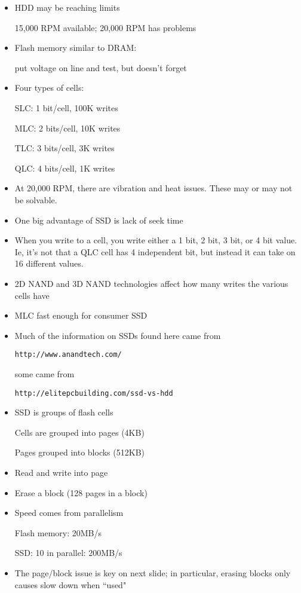 \begin{frame}[fragile]
\begin{itemize}
	\item HDD may be reaching limits

		15,000 RPM available; 20,000 RPM has problems
	\item Flash memory similar to DRAM:

		put voltage on line and test, but doesn't forget
	\item Four types of cells:

		SLC: 1 bit/cell, 100K writes

		MLC: 2 bits/cell, 10K writes

		TLC: 3 bits/cell, 3K writes

		QLC: 4 bits/cell, 1K writes

\end{itemize}
\BNotes\ifnum{}
\begin{itemize}
\item At 20,000 RPM, there are vibration and heat issues.  These may or
	may not be solvable.
\item One big advantage of SSD is lack of seek time
\item When you write to a cell, you write either a 1 bit, 2 bit, 3 bit, or 4 bit value.  Ie, it's not that a QLC cell has 4 independent bit, but instead it can take on 16 different values.
\item 2D NAND and 3D NAND technologies affect how many writes the various
		cells have

\item MLC fast enough for consumer SSD
\item Much of the information on SSDs found here came from

\texttt{http://www.anandtech.com/}

some came from

\texttt{http://elitepcbuilding.com/ssd-vs-hdd}
\end{itemize}
\fi\ENotes
\end{frame}

\begin{frame}[fragile]
\begin{itemize}
	\item SSD is groups of flash cells

	Cells are grouped into pages (4KB)

	Pages grouped into blocks (512KB)
	\item Read and write into page
	\item Erase a block (128 pages in a block)
	\item Speed comes from parallelism

		Flash memory: 20MB/s

		SSD: 10 in parallel: 200MB/s
\end{itemize}
\BNotes\ifnum{}
\begin{itemize}
\item The page/block issue is key on next slide; in particular, erasing
	blocks only causes slow down when ``used"
\end{itemize}
\fi\ENotes
\end{frame}

